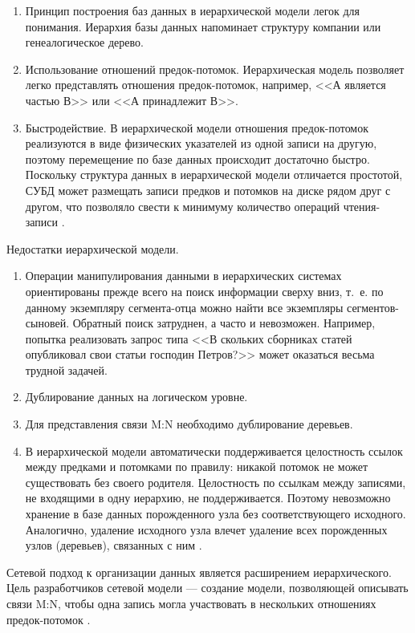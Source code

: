 \documentclass{bmstu}
\begin{document}
\begin{enumerate}
\item Принцип построения баз данных в иерархической модели легок для понимания. 
Иерархия базы данных напоминает структуру компании или генеалогическое дерево.
\item Использование отношений предок-потомок. 
Иерархическая модель позволяет легко представлять отношения предок-потомок, например, <<А является частью В>> или <<А принадлежит В>>.
\item Быстродействие. 
В иерархической модели отношения предок-потомок реализуются в виде физических указателей из одной записи на другую, поэтому перемещение по базе данных происходит достаточно быстро. 
Поскольку структура данных в иерархической модели отличается простотой, СУБД может размещать записи предков и
потомков на диске рядом друг с другом, что позволяло свести к минимуму количество операций чтения-записи \cite{Avrunev2018}.
\end{enumerate}

Недостатки иерархической модели.

\begin{enumerate}
\item Операции манипулирования данными в иерархических системах ориентированы прежде всего на поиск информации сверху вниз, т.~е. по данному экземпляру сегмента-отца можно найти все экземпляры сегментов-сыновей. 
Обратный поиск затруднен, а часто и невозможен. 
Например, попытка реализовать запрос типа <<В скольких сборниках статей опубликовал свои статьи господин Петров?>> может оказаться весьма трудной задачей.
\item Дублирование данных на логическом уровне.
\item Для представления связи M:N необходимо дублирование деревьев.
\item В иерархической модели автоматически поддерживается целостность ссылок между предками и потомками по правилу: никакой потомок не может существовать без своего родителя. 
Целостность по ссылкам между записями, не входящими в одну иерархию, не поддерживается. 
Поэтому невозможно хранение в базе данных порожденного узла без соответствующего исходного. 
Аналогично, удаление исходного узла влечет удаление всех порожденных узлов (деревьев), связанных с ним \cite{Avrunev2018}.
\end{enumerate}

Сетевой подход к организации данных является расширением
иерархического. 
Цель разработчиков сетевой модели --- создание модели, позволяющей описывать связи M:N, чтобы одна запись могла участвовать в нескольких отношениях предок-потомок \cite{Avrunev2018}.
\end{document}
